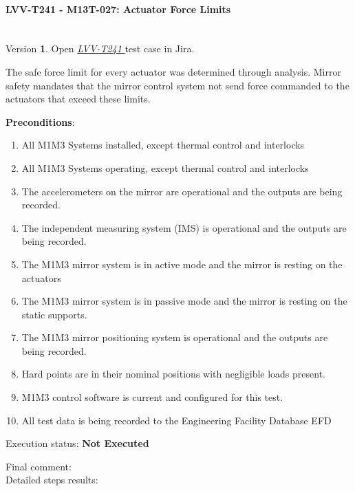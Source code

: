 \documentclass[SE,lsstdraft,STR,toc]{lsstdoc}
\providecommand{\tightlist}{
  \setlength{\itemsep}{0pt}\setlength{\parskip}{0pt}}
\begin{document}
\paragraph{ LVV-T241 - M13T-027: Actuator Force Limits }\mbox{}\\

Version \textbf{1}.
Open  \href{https://jira.lsstcorp.org/secure/Tests.jspa#/testCase/LVV-T241}{\textit{ LVV-T241 } }
test case in Jira.

The safe force limit for every actuator was determined through analysis.
Mirror safety mandates that the mirror control system not send force
commanded to the actuators that exceed these limits.

\textbf{ Preconditions}:\\
\begin{enumerate}
\tightlist
\item
  All M1M3 Systems installed, except thermal control and interlocks
\item
  All M1M3 Systems operating, except thermal control and interlocks
\item
  The accelerometers on the mirror are operational and the outputs are
  being recorded.
\item
  The independent measuring system (IMS) is operational and the outputs
  are being recorded.
\item
  The M1M3 mirror system is in active mode and the mirror is resting on
  the actuators
\item
  The M1M3 mirror system is in passive mode and the mirror is resting on
  the static supports.
\item
  The M1M3 mirror positioning system is operational and the outputs are
  being recorded.
\item
  Hard points are in their nominal positions with negligible loads
  present.
\item
  M1M3 control software is current and configured for this test.
\item
  All test data is being recorded to the Engineering Facility Database
  EFD
\end{enumerate}

Execution status: {\bf Not Executed }

Final comment:\\


Detailed steps results:
\end{document}
